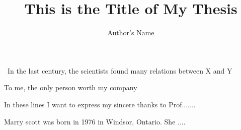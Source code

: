 \documentclass[options]{vlsithesis}
\begin{document}
\frontmatter



\title{This is the Title of My Thesis}

\author{Author's Name}



\maketitle



\makecopyright

\makeapproval

%

\begin{chapterabstract} \ In the last century, the scientists found many relations between X and Y
\end{chapterabstract}




%
\begin{dedication}
\vspace*{2.5in}
To me, the only person worth my company
\vfill
\end{dedication}


\begin{dedication}
\vspace*{2.5in}
In these lines I want to express my sincere thanks to Prof.......
\vfill
\end{dedication}


%
\begin{vita}
Marry scott was born in 1976 in Windsor, Ontario. She ....
\end{vita}
\end{document}
